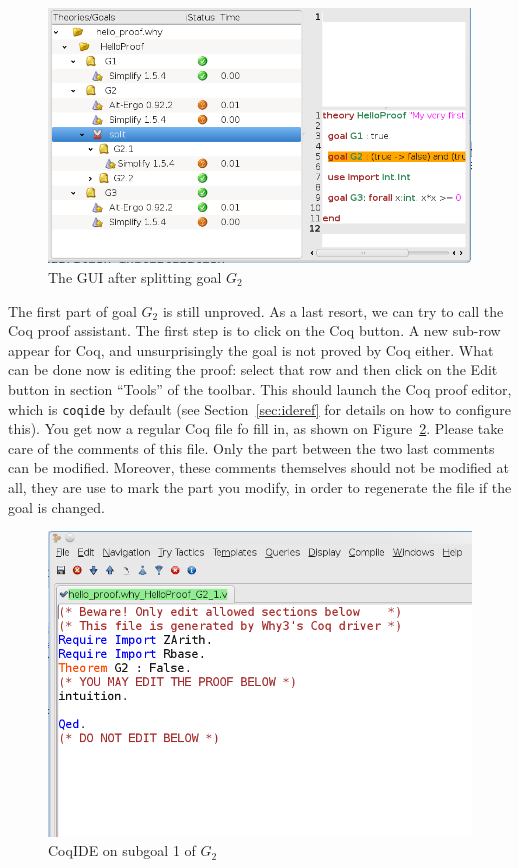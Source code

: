 \begin{figure}[tbp]
  \includegraphics[width=\textwidth]{gui4.png}
  \caption{The GUI after splitting goal $G_2$}
  \label{fig:gui4}
\end{figure}

The first part of goal $G_2$ is still unproved. As a last resort, we
can try to call the Coq proof assistant. The first step is to click on
the \textsf{Coq} button. A new sub-row appear for Coq, and
unsurprisingly the goal is not proved by Coq either. What can be done
now is editing the proof: select that row and then click on the
\textsf{Edit} button in section ``Tools'' of the toolbar. This should
launch the Coq proof editor, which is \texttt{coqide} by default (see
Section~\ref{sec:ideref} for details on how to configure this). You get
now a regular Coq file fo fill in, as shown on Figure~\ref{fig:coqide}.
Please take care of the comments of this file. Only the part between
the two last comments can be modified. Moreover, these comments
themselves should not be modified at all, they are use to mark the
part you modify, in order to regenerate the file if the goal is
changed. 

\begin{figure}[tbp]
  \includegraphics[width=\textwidth]{coqide.png}
  \caption{CoqIDE on subgoal 1 of $G_2$}
  \label{fig:coqide}
\end{figure}

